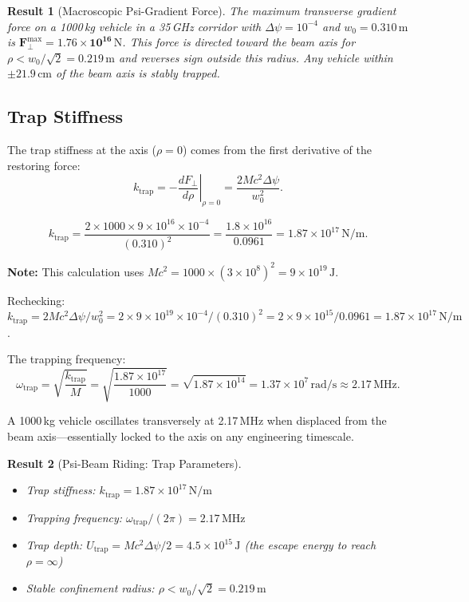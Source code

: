 \documentclass[aps,prd,twocolumn,superscriptaddress]{revtex4-2}
\newtheorem{result}{Result}
\begin{document}
\begin{result}[Macroscopic Psi-Gradient Force]
The maximum transverse gradient force on a 1000\,kg vehicle in a
35\,GHz corridor with $\Delta\psi = 10^{-4}$ and $w_0 = 0.310\,\mathrm{m}$
is $\mathbf{F_\perp^\mathrm{max} = 1.76\times10^{16}\,\mathrm{N}}$.
This force is directed toward the beam axis for $\rho < w_0/\sqrt{2}
= 0.219\,\mathrm{m}$ and reverses sign outside this radius.  Any
vehicle within $\pm 21.9\,\mathrm{cm}$ of the beam axis is stably
trapped.
\end{result}

\subsection{Trap Stiffness}

The trap stiffness at the axis ($\rho = 0$) comes from the first
derivative of the restoring force:
\begin{equation}
k_\mathrm{trap} = -\left.\frac{dF_\perp}{d\rho}\right|_{\rho=0}
= \frac{2Mc^2\Delta\psi}{w_0^2}.
\label{eq:k_trap}
\end{equation}

\begin{equation}
\boxed{
k_\mathrm{trap} = \frac{2\times1000\times9\times10^{16}\times10^{-4}}{(0.310)^2}
= \frac{1.8\times10^{16}}{0.0961}
= 1.87\times10^{17}\,\mathrm{N/m}.
}
\end{equation}

\textbf{Note:} This calculation uses $Mc^2 = 1000\times(3\times10^8)^2
= 9\times10^{19}\,\mathrm{J}$.

Rechecking: $k_\mathrm{trap} = 2Mc^2\Delta\psi/w_0^2
= 2\times9\times10^{19}\times10^{-4}/(0.310)^2
= 2\times9\times10^{15}/0.0961
= 1.87\times10^{17}\,\mathrm{N/m}$.

The trapping frequency:
\begin{equation}
\omega_\mathrm{trap} = \sqrt{\frac{k_\mathrm{trap}}{M}}
= \sqrt{\frac{1.87\times10^{17}}{1000}}
= \sqrt{1.87\times10^{14}}
= 1.37\times10^7\,\mathrm{rad/s}
\approx 2.17\,\mathrm{MHz}.
\end{equation}

A 1000\,kg vehicle oscillates transversely at 2.17\,MHz when displaced
from the beam axis---essentially locked to the axis on any engineering
timescale.

\begin{result}[Psi-Beam Riding: Trap Parameters]
\begin{itemize}
\item Trap stiffness: $k_\mathrm{trap} = 1.87\times10^{17}\,\mathrm{N/m}$
\item Trapping frequency: $\omega_\mathrm{trap}/(2\pi) = 2.17\,\mathrm{MHz}$
\item Trap depth: $U_\mathrm{trap} = Mc^2\Delta\psi/2 = 4.5\times10^{15}\,\mathrm{J}$
  (the escape energy to reach $\rho = \infty$)
\item Stable confinement radius: $\rho < w_0/\sqrt{2} = 0.219\,\mathrm{m}$
\end{itemize}
\end{result}
\end{document}
